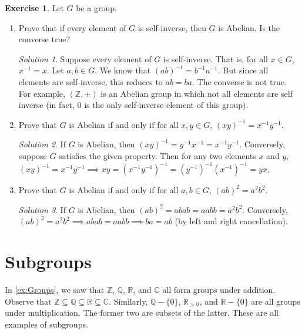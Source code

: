 \documentclass[svgnames]{article}
\theoremstyle{definition}
\newtheorem{Exercise}{Exercise}[section]
\theoremstyle{remark}
\newtheorem*{Solution*}{Solution}
\begin{document}
\begin{Exercise}
Let $G$ be a group.
\begin{enumerate}
\item\label{it:Ord2=>Abelian} Prove that if every element of $G$ is self-inverse, then $G$ is Abelian. Is the converse true?

\begin{Solution*}
Suppose every element of $G$ is self-inverse. That is, for all $x \in G$, $x^{-1} = x$. Let $a, b \in G$. We know that $(ab)^{-1} = b^{-1} a^{-1}$. But since all elements are self-inverse, this reduces to $ab = ba$. The converse is not true. For example, $(\mathbb Z, +)$ is an Abelian group in which not all elements are self inverse (in fact, $0$ is the only self-inverse element of this group).
\end{Solution*}

\item Prove that $G$ is Abelian if and only if for all $x, y \in G$, $(xy)^{-1} = x^{-1}y^{-1}$.

\begin{Solution*}
If $G$ is Abelian, then $(xy)^{-1} = y^{-1} x^{-1} = x^{-1} y^{-1}$. Conversely, suppose $G$ satisfies the given property. Then for any two elements $x$ and $y$, $(xy)^{-1} = x^{-1} y^{-1} \implies xy = (x^{-1} y^{-1})^{-1} = (y^{-1})^{-1} (x^{-1})^{-1} = yx$.
\end{Solution*}

\item Prove that $G$ is Abelian if and only if for all $a, b \in G$, $(ab)^2 = a^2 b^2$.

\begin{Solution*}
If $G$ is Abelian, then $(ab)^2 = abab = aabb = a^2b^2$. Conversely, $(ab)^2 = a^2 b^2 \implies abab = aabb \implies ba = ab$ (by left and right cancellation).
\end{Solution*}
\end{enumerate}
\end{Exercise}

\section{Subgroups}\label{sec:Subgroups}

In \cref{ex:Groups}, we saw that $\mathbb Z$, $\mathbb Q$, $\mathbb R$, and $\mathbb C$ all form groups under addition. Observe that $\mathbb Z \subseteq \mathbb Q \subseteq \mathbb R \subseteq \mathbb C$. Similarly, $\mathbb Q - \{0\}$, $\mathbb R_{>0}$, and $\mathbb R - \{0\}$ are all groups under multiplication. The former two are subsets of the latter. These are all examples of subgroups.
\end{document}
